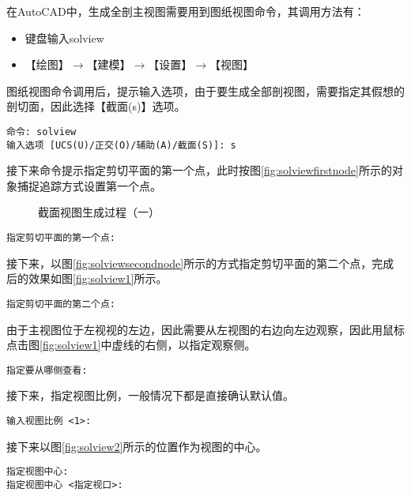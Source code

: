 \begin{procedure}
\begin{enumerate}
在AutoCAD中，生成全剖主视图需要用到图纸视图命令，其调用方法有：
\begin{itemize}
\item 键盘输入solview
\item 【绘图】$\rightarrow $【建模】$\rightarrow $【设置】$\rightarrow $【视图】
\end{itemize}

图纸视图命令调用后，提示输入选项，由于要生成全部剖视图，需要指定其假想的剖切面，因此选择【截面(s)】选项。
\begin{lstlisting}
命令: solview
输入选项 [UCS(U)/正交(O)/辅助(A)/截面(S)]: s
\end{lstlisting}

接下来命令提示指定剪切平面的第一个点，此时按图\ref{fig:solviewfirstnode}所示的对象捕捉追踪方式设置第一个点。

\begin{figure}[htbp]
\centering
{}\hspace{20pt}
\hspace{20pt}
\caption{截面视图生成过程（一）}
\end{figure}

\begin{lstlisting}
指定剪切平面的第一个点:
\end{lstlisting}

接下来，以图\ref{fig:solviewsecondnode}所示的方式指定剪切平面的第二个点，完成后的效果如图\ref{fig:solview1}所示。
\begin{lstlisting}
指定剪切平面的第二个点:
\end{lstlisting}

由于主视图位于左视视的左边，因此需要从左视图的右边向左边观察，因此用鼠标点击图\ref{fig:solview1}中虚线的右侧，以指定观察侧。
\begin{lstlisting}
指定要从哪侧查看:
\end{lstlisting}

接下来，指定视图比例，一般情况下都是直接确认默认值。
\begin{lstlisting}
输入视图比例 <1>:
\end{lstlisting}

接下来以图\ref{fig:solview2}所示的位置作为视图的中心。
\begin{lstlisting}
指定视图中心:
指定视图中心 <指定视口>:
\end{lstlisting}


\end{enumerate}
\end{procedure}
